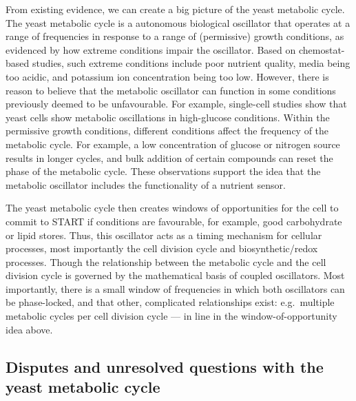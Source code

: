 From existing evidence, we can create a big picture of the yeast metabolic cycle.
The yeast metabolic cycle is a autonomous biological oscillator that operates at a range of frequencies in response to a range of (permissive) growth conditions, as evidenced by how extreme conditions impair the oscillator.
Based on chemostat-based studies, such extreme conditions include poor nutrient quality, media being too acidic, and potassium ion concentration being too low.
However, there is reason to believe that the metabolic oscillator can function in some conditions previously deemed to be unfavourable.
For example, single-cell studies show that yeast cells show metabolic oscillations in high-glucose conditions.
Within the permissive growth conditions, different conditions affect the frequency of the metabolic cycle.
For example, a low concentration of glucose or nitrogen source results in longer cycles, and bulk addition of certain compounds can reset the phase of the metabolic cycle.
These observations support the idea that the metabolic oscillator includes the functionality of a nutrient sensor.

The yeast metabolic cycle then creates windows of opportunities for the cell to commit to START if conditions are favourable, for example, good carbohydrate or lipid stores.
Thus, this oscillator acts as a timing mechanism for cellular processes, most importantly the cell division cycle and biosynthetic/redox processes.
Though the relationship between the metabolic cycle and the cell division cycle is governed by the mathematical basis of coupled oscillators.
Most importantly, there is a small window of frequencies in which both oscillators can be phase-locked, and that other, complicated relationships exist: e.g.\ multiple metabolic cycles per cell division cycle --- in line in the window-of-opportunity idea above.


\subsection{Disputes and unresolved questions with the yeast metabolic cycle}
\label{subsec:intro-ymc-unresolved}

